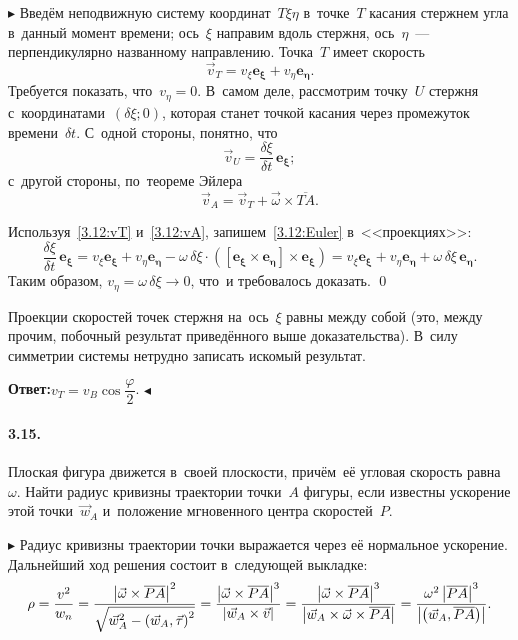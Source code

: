 \documentclass{weekly}
\begin{document}
$\blacktriangleright$ Введём неподвижную систему координат~$T\xi\eta$
в~точке~$T$ касания стержнем угла в~данный момент времени;
ось~$\xi$ направим вдоль стержня,
ось~$\eta$~--- перпендикулярно названному направлению.
Точка~$T$ имеет скорость
\begin{equation}\label{3.12:vT}
    \vec v_T = v_\xi \mathbf{e_\xi} + v_\eta \mathbf{e_\eta}.
\end{equation}
Требуется показать, что~$v_\eta = 0$. В~самом деле, рассмотрим
точку~$U$ стержня с~координатами~$(\delta \xi; 0)$,
которая станет точкой касания через промежуток времени~$\delta t$.
С~одной стороны, понятно, что
\begin{equation}\label{3.12:vA}
    \vec v_U = \frac{\delta \xi}{\delta t} \,\mathbf{e_\xi};
\end{equation}
с~другой стороны, по~теореме Эйлера
\begin{equation}\label{3.12:Euler}
    \vec v_A = \vec v_T + \vec\omega \times \overline{TA}.
\end{equation}

Используя~\eqref{3.12:vT} и~\eqref{3.12:vA}, запишем~\eqref{3.12:Euler}
в~<<проекциях>>:
\begin{equation}
    \frac{\delta\xi}{\delta t} \,\mathbf{e_\xi}
        = v_\xi \mathbf{e_\xi} + v_\eta \mathbf{e_\eta} -
            \omega\,\delta\xi \cdot
            \left(\mathbf{[e_\xi \times e_\eta] \times
                \mathbf{e_\xi}}\right)
        = v_\xi \mathbf{e_\xi} + v_\eta \mathbf{e_\eta} +
            \omega\,\delta\xi \,\mathbf{e_\eta}.
\end{equation}
Таким образом, $v_\eta = \omega \,\delta\xi \to 0$,
что~и требовалось доказать. \qed

Проекции скоростей точек стержня
на~ось~$\xi$ равны между собой (это, между прочим, побочный результат
приведённого выше доказательства). В~силу симметрии системы
нетрудно записать искомый результат.

\textbf{Ответ:}\quad $v_T = v_B \cos\dfrac{\varphi}{2}$.
\hfill $\blacktriangleleft$


\paragraph{3.15.} Плоская фигура движется в~своей плоскости,
причём~её угловая скорость равна~$\omega$. Найти радиус кривизны
траектории точки~$A$ фигуры, если известны ускорение
этой точки~$\vec w_A$ и~положение мгновенного центра скоростей~$P$.

$\blacktriangleright$ Радиус кривизны траектории точки выражается
через её нормальное ускорение. Дальнейший ход решения
состоит в~следующей выкладке:
\begin{equation}
    \rho = \frac{v^2}{w_n}
        = \frac{\left| \vec\omega \times \overline{PA} \right|^2}
            {\sqrt{\vec w_A^2 - \left(\vec w_A, \vec\tau\right)^2}}
        = \frac{\left| \vec\omega \times \overline{PA} \right|^3}
            {\left| \vec w_A \times \vec v \right|}
        = \frac{\left| \vec\omega \times \overline{PA} \right|^3}
            {\left| \vec w_A \times \vec\omega \times \overline{PA} \right|}
        = \frac{\omega^2 \left| \overline{PA} \right|^3}
            {\left| \left(\vec w_A, \overline{PA}\right) \right|}.
\end{equation}
\end{document}
